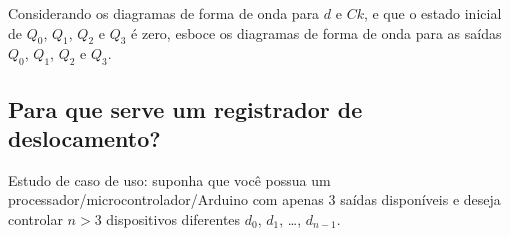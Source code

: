 \documentclass[a4paper,12pt,notitlepage]{article}
\begin{document}
Considerando os diagramas de forma de onda para $d$ e $Ck$, e que o estado
inicial de $Q_0$, $Q_1$, $Q_2$ e $Q_3$ é zero, esboce os diagramas de forma
de onda para as saídas $Q_0$, $Q_1$, $Q_2$ e $Q_3$.

\newcommand{\clockcycle}[2]{\draw[very thick] (#1,#2) -- (#1+1,#2) -- (#1+1,#2+1) -- (#1+2,#2+1) -- (#1+2,#2) -- (#1+3,#2); \draw[->,very thick] (#1+2,#2+1) -- (#1+2,#2+0.5);}

\begin{center}
\end{center}

\subsection{Para que serve um registrador de deslocamento?}

Estudo de caso de uso: suponha que você possua um
processador/microcontrolador/Arduino com apenas $3$ saídas disponíveis e
deseja controlar $n > 3$ dispositivos diferentes $d_0$, $d_1$, \ldots, $d_{n-1}$.

\newcommand{\stereobox}[5][]{
  \draw[thick] (#2,#3) rectangle ++(#4-0.2,#5-0.2) node[pos=.5] {#1};
  \draw[thick] (#2+#4-0.2,#3) -- (#2+#4+0.2,#3+0.4) -- (#2+#4+0.2,#3+#5+0.2)
               -- (#2+0.4,#3+#5+0.2) -- (#2,#3+#5-0.2);
  \draw[thick] (#2+#4+0.2,#3+#5+0.2) -- (#2+#4-0.2,#3+#5-0.2);
}
\end{document}
